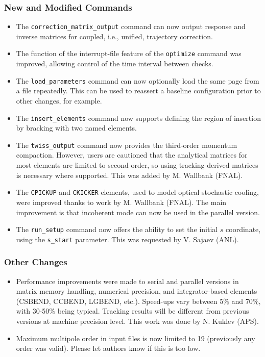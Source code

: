 \documentclass[11pt]{article}
\begin{document}
\subsubsection{New and Modified Commands}
\begin{itemize}
\item The \verb|correction_matrix_output| command can now output response and inverse matrices for
  coupled, i.e., unified, trajectory correction.
\item The function of the interrupt-file feature of the \verb|optimize| command was improved, allowing control of
  the time interval between checks.
\item The \verb|load_parameters| command can now optionally load the same page from a file repeatedly. This can be
  used to reassert a baseline configuration prior to other changes, for example.
\item The \verb|insert_elements| command now supports defining the region of insertion by bracking with two named elements.
\item The \verb|twiss_output| command now provides the third-order momentum compaction. However, users are cautioned that
  the analytical matrices for most elements are limited to second-order, so using tracking-derived matrices is necessary
  where supported. This was added by M. Wallbank (FNAL).
\item The \verb|CPICKUP| and \verb|CKICKER| elements, used to model optical stochastic cooling, were improved thanks to
  work by M. Wallbank (FNAL). The main improvement is that incoherent mode can now be used in the parallel version. 
\item The \verb|run_setup| command now offers the ability to set the initial $s$ coordinate, using the \verb|s_start| parameter.
  This was requested by V. Sajaev (ANL).
\end{itemize}

\subsubsection{Other Changes}

\begin{itemize}
\item Performance improvements were made to serial and parallel versions in matrix memory handling, numerical precision,
  and integrator-based elements (CSBEND, CCBEND, LGBEND, etc.). Speed-ups vary between 5\% and 70\%, with 30-50\% being
  typical. Tracking results will be different from previous versions at machine precision level. This work was done by
  N. Kuklev (APS).
\item Maximum multipole order in input files is now limited to 19 (previously any order was valid). Please let authors know if this is too low.
\end{itemize}
\end{document}
